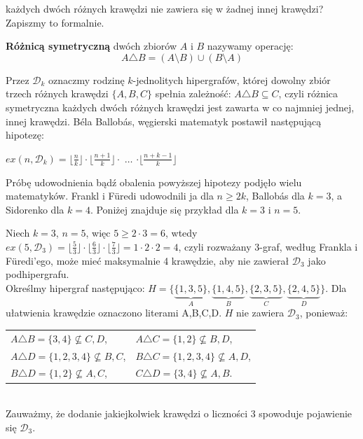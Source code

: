 \documentclass[miz,woman]{mgrwms}
\begin{document}
każdych dwóch różnych krawędzi nie zawiera się w żadnej innej krawędzi? Zapiszmy to formalnie. 
\begin{defi}
 \textbf{Różnicą symetryczną} dwóch zbiorów $A$ i $B$ nazywamy operację:
\begin{equation}
 A\triangle B=(A\setminus B)\cup (B\setminus A)
\end{equation}
\end{defi}
Przez $\mathcal{D}_k$ oznaczmy rodzinę $k$-jednolitych hipergrafów, której dowolny zbiór trzech różnych krawędzi $\{A,B,C\}$
spełnia zależność: $A\triangle B\subseteq C$, czyli różnica symetryczna każdych dwóch różnych krawędzi jest zawarta
w co najmniej jednej, innej krawędzi.
B\'ela Ballob\'as, węgierski matematyk postawił następującą hipotezę:
\begin{hip}\label{hipoteza}
$ex(n,\mathcal{D}_k)=\lfloor \frac{n}{k} \rfloor \cdot \lfloor \frac{n+1}{k} \rfloor \cdot$ $\dots$ $\cdot \lfloor \frac{n+k-1}{k} \rfloor$
\end{hip}
Próbę udowodnienia bądź obalenia powyższej hipotezy podjęło wielu matematyków. Frankl i F\"{u}redi udowodnili ja dla $n\geq 2k$,
Ballob\'as dla $k=3$, a Sidorenko dla $k=4$. Poniżej znajduje się przykład dla $k=3$ i $n=5$.
\begin{przy}
Niech $k=3$, $n=5$, więc $5\geq 2\cdot 3 =6$, wtedy $ex(5,\mathcal{D}_3)=\lfloor \frac{5}{3} \rfloor \cdot \lfloor \frac{6}{3} \rfloor \cdot
 \lfloor \frac{7}{3} \rfloor=1\cdot 2\cdot 2 =4$, czyli rozważany 3-graf, według Frankla i F\"{u}redi'ego, może mieć maksymalnie
4 krawędzie, aby nie zawierał $\mathcal{D}_3$ jako podhipergrafu.\\
Określmy hipergraf następująco: $H=\{\underbrace{\{1,3,5\}}_{A},\underbrace{\{1,4,5\}}_{B},\underbrace{\{2,3,5\}}_{C}, 
\underbrace{\{2,4,5\}}_{D}\}$. Dla ułatwienia krawędzie oznaczono literami A,B,C,D. $H$ nie zawiera $\mathcal{D}_3$, ponieważ:\\ 


\begin{tabular}{l l}
$ A \triangle B=\{3,4\}\not \subseteq C,D$,& $ A \triangle C=\{1,2\}\not \subseteq B,D$,\\
$ A \triangle D=\{1,2,3,4\}\not\subseteq B,C$, & $ B \triangle C=\{1,2,3,4\}\not \subseteq A,D$,\\
$ B \triangle D=\{1,2\}\not \subseteq A,C$, & $ C \triangle D=\{3,4\}\not \subseteq A,B$.
\end{tabular}\\
Zauważmy, że dodanie jakiejkolwiek krawędzi o liczności 3 spowoduje pojawienie się $\mathcal{D}_3$.
\end{przy}
\end{document}
